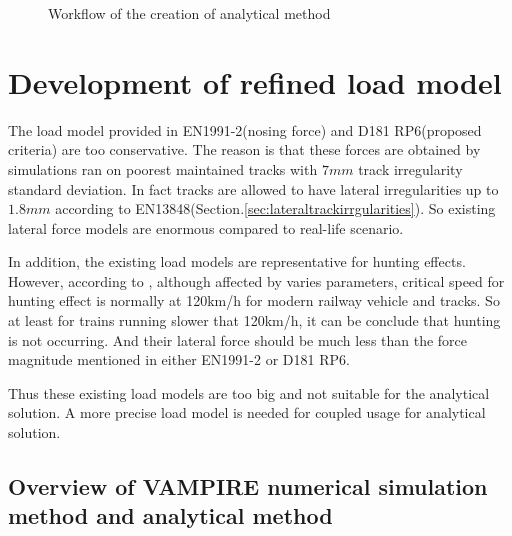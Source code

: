 \begin{figure}[h!]
\centering
{}
\caption{Workflow of the creation of analytical method}
\label{fig:workflowanalyticalmethod}
\end{figure}

\section{Development of refined load model}\label{sec:refinedloadmodel}

The load model provided in EN1991-2(nosing force) and D181 RP6(proposed criteria) are too conservative. The reason is that these forces are obtained by simulations ran on poorest maintained tracks with $7mm$ track irregularity standard deviation. In fact tracks are allowed to have lateral irregularities up to $1.8mm$ according to EN13848(Section.\ref{sec:lateraltrackirrgularities}). So existing lateral force models are enormous compared to real-life scenario. 

In addition, the existing load models are representative for hunting effects\cite[Proposed criteria]{d181}. However, according to \cite{majka2008effects}, although affected by varies parameters, critical speed for hunting effect is normally at 120km/h for modern railway vehicle and tracks. So at least for trains running slower that 120km/h, it can be conclude that hunting is not occurring. And their lateral force should be much less than the force magnitude mentioned in either EN1991-2 or D181 RP6.

Thus these existing load models are too big and not suitable for the analytical solution. A more precise load model is needed for coupled usage for analytical solution.

\subsection{Overview of VAMPIRE numerical simulation method and analytical method}\label{sec:overviewvampireanalytical}

